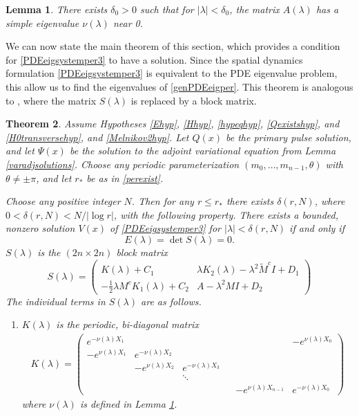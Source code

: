 \documentclass[11pt,reqno]{amsart}
\theoremstyle{plain}
\newtheorem{theorem}{Theorem}
\newtheorem{lemma}[theorem]{Lemma}
\theoremstyle{definition}
\theoremstyle{remark}
\begin{document}
\begin{lemma}\label{nulambdalemmasimple}
There exists $\delta_0 > 0$ such that for $|\lambda| < \delta_0$, the matrix $A(\lambda)$ has a simple eigenvalue $\nu(\lambda)$ near 0.
\end{lemma}

We can now state the main theorem of this section, which provides a condition for \cref{PDEeigsystemper3} to have a solution. Since the spatial dynamics formulation \cref{PDEeigsystemper3} is equivalent to the PDE eigenvalue problem, this allow us to find the eigenvalues of \cref{genPDEeigper}. This theorem is analogous to \cite[Theorem 2]{Sandstede1998}, where the matrix $S(\lambda)$ is replaced by a block matrix.

\begin{theorem}\label{blockmatrixtheorem}
Assume Hypotheses \ref{Ehyp}, \ref{Hhyp}, \ref{hypeqhyp}, \ref{Qexistshyp}, and \ref{H0transversehyp}, and \ref{Melnikov2hyp}. Let $Q(x)$ be the primary pulse solution, and let $\Psi(x)$ be the solution to the adjoint variational equation from Lemma \ref{varadjsolutions}. Choose any periodic parameterization $(m_0, \dots, m_{n-1}, \theta)$ with $\theta \neq \pm \pi$, and let $r_*$ be as in \cref{perexist}. 

Choose any positive integer $N$. Then for any $r \leq r_*$ there exists $\delta(r,N)$, where $0 < \delta(r,N) < N/|\log r|$, with the following property. There exists a bounded, nonzero solution $V(x)$ of \cref{PDEeigsystemper3} for $|\lambda| < \delta(r,N)$ if and only if
\begin{equation}\label{blockmatrixcond}
E(\lambda) = \det S(\lambda) = 0.
\end{equation}
$S(\lambda)$ is the $(2n \times 2n)$ block matrix
\begin{equation}\label{blockeq}
S(\lambda) = 
\begin{pmatrix}
K(\lambda) + C_1 & \lambda K_2(\lambda) - \lambda^2 \tilde{M}^c I + D_1 \\
-\frac{1}{2} \lambda M^c K_1(\lambda) + C_2 & A - \lambda^2 MI + D_2
\end{pmatrix}
\end{equation}
The individual terms in $S(\lambda)$ are as follows.

\begin{enumerate}
\item $K(\lambda)$ is the periodic, bi-diagonal matrix
\begin{align*}
K(\lambda) =  
\begin{pmatrix}
e^{-\nu(\lambda)X_1} & & & & & -e^{\nu(\lambda)X_0} \\
-e^{\nu(\lambda)X_1} & e^{-\nu(\lambda)X_2} \\
& -e^{\nu(\lambda)X_2} & e^{-\nu(\lambda)X_3} \\
  & & \ddots & && \\
& & & & -e^{\nu(\lambda)X_{n-1}} & e^{-\nu(\lambda)X_0}
\end{pmatrix}
\end{align*}
where $\nu(\lambda)$ is defined in Lemma \ref{nulambdalemmasimple}.


\end{enumerate}
\end{theorem}
\end{document}
